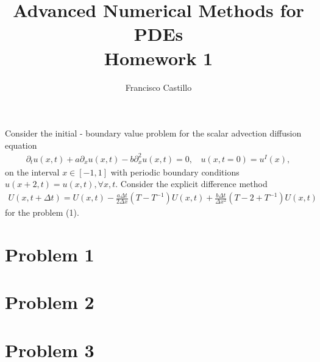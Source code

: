 \documentclass[12pt,answers]{exam}
\begin{document}
 
 
 
\title{\textbf{Advanced Numerical Methods for PDEs}\\ \Large{Homework 1}}%
\author{Francisco Castillo}
 

\maketitle
Consider the initial - boundary value problem for the scalar advection diffusion equation
\begin{align}\label{eq:PDE}
\partial_tu(x,t)+a\partial_xu(x,t)-b\partial_x^2u(x,t)=0,~~~~
u(x,t=0)=u^I(x),
\end{align}
on the interval $x\in[-1, 1]$ with periodic boundary conditions $u(x + 2, t) = u(x, t), \forall x, t$.
Consider the explicit difference method 
\begin{align}\label{eq:discrPDE}
U(x, t+\Delta t) = U(x, t)-\frac{a\Delta t}{ 2\Delta x}(T-T^{-1})U(x,t)+\frac{b\Delta t}{\Delta x^2}(T-2+T^{-1})U(x, t)
\end{align}
for the problem (1).
\section*{Problem 1}

\newpage
\section*{Problem 2}

\newpage
\section*{Problem 3}





\end{document}
